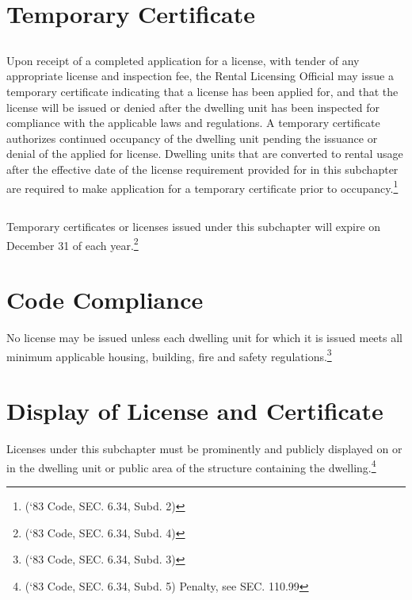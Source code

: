 \section{Temporary Certificate}
\subsection{}
Upon receipt of a completed application for a license, with tender of any appropriate license and inspection fee, the Rental Licensing Official may issue a temporary certificate indicating that a license has been applied for, and that the license will be issued or denied after the dwelling unit has been inspected for compliance with the applicable laws and regulations.  A temporary certificate authorizes continued occupancy of the dwelling unit pending the issuance or denial of the applied for license.  Dwelling units that are converted to rental usage after the effective date of the license requirement provided for in this subchapter are required to make application for a temporary certificate prior to occupancy.\footnote{(‘83 Code, SEC. 6.34, Subd. 2)}
\subsection{}
Temporary certificates or licenses issued under this subchapter will expire on December 31 of each year.\footnote{(‘83 Code, SEC. 6.34, Subd. 4)}
\section{Code Compliance}
No license may be issued unless each dwelling unit for which it is issued meets all minimum applicable housing, building, fire and safety regulations.\footnote{(‘83 Code, SEC. 6.34, Subd. 3)}
\section{Display of License and Certificate}
Licenses under this subchapter must be prominently and publicly displayed on or in the dwelling unit or public area of the structure containing the dwelling.\footnote{(‘83 Code, SEC. 6.34, Subd. 5)  Penalty, see SEC. 110.99}
